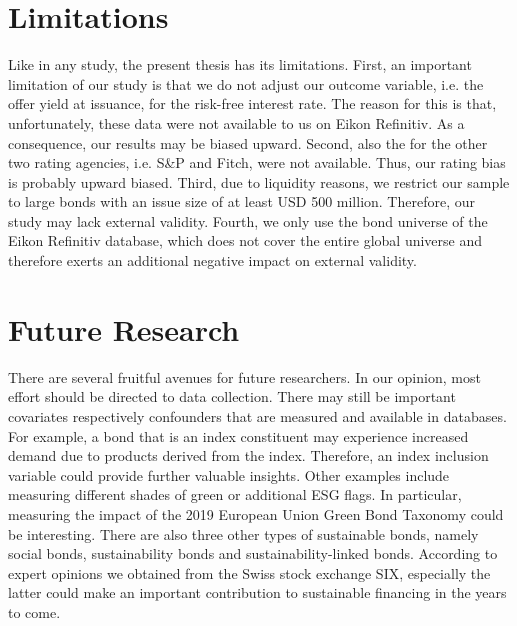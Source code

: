 \section{Limitations}

Like in any study, the present thesis has its limitations. First, an important limitation of our study is that we do not adjust our outcome variable, i.e. the offer yield at issuance, for the risk-free interest rate. The reason for this is that, unfortunately, these data were not available to us on Eikon Refinitiv. As a consequence, our results may be biased upward. Second, also the for the other two rating agencies, i.e. S\&P and Fitch, were not available. Thus, our rating bias is probably upward biased. Third, due to liquidity reasons, we restrict our sample to large bonds with an issue size of at least USD 500 million. Therefore, our study may lack external validity. Fourth, we only use the bond universe of the Eikon Refinitiv database, which does not cover the entire global universe and therefore exerts an additional negative impact on external validity.

\section{Future Research}

There are several fruitful avenues for future researchers. In our opinion, most effort should be directed to data collection. There may still be important covariates respectively confounders that are measured and available in databases. For example, a bond that is an index constituent may experience increased demand due to products derived from the index. Therefore, an index inclusion variable could provide further valuable insights. Other examples include measuring different shades of green or additional ESG flags. In particular, measuring the impact of the 2019 European Union Green Bond Taxonomy could be interesting. There are also three other types of sustainable bonds, namely social bonds, sustainability bonds and sustainability-linked bonds. According to expert opinions we obtained from the Swiss stock exchange SIX, especially the latter could make an important contribution to sustainable financing in the years to come.


